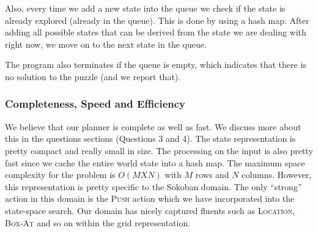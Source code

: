 \documentclass[10pt, letter]{article}
\begin{document}
Also, every time we add a new state into the queue we check if the state is already explored (already in the queue). This is done by using a hash map. After adding all possible states that can be derived from the state we are dealing with right now, we move on to the next state in the queue. 

The program also terminates if the queue is empty, which indicates that there is no solution to the puzzle (and we report that).

\subsubsection*{Completeness, Speed and Efficiency}
We believe that our planner is complete as well as fast. We discuss more about this in the questions sections (Questions 3 and 4).
The state representation is pretty compact and really small in size. The processing on the input is also pretty fast since we cache the entire world state into a hash map. The maximum space complexity for the problem is $O(MXN)$ with $M$ rows and $N$ columns. However, this representation is pretty specific to the Sokoban domain. The only ``strong'' action in this domain is the \textsc{Push} action which we have incorporated into the state-space search. Our domain has nicely captured fluents such as \textsc{Location}, \textsc{Box-At} and so on within the grid representation.
\end{document}

